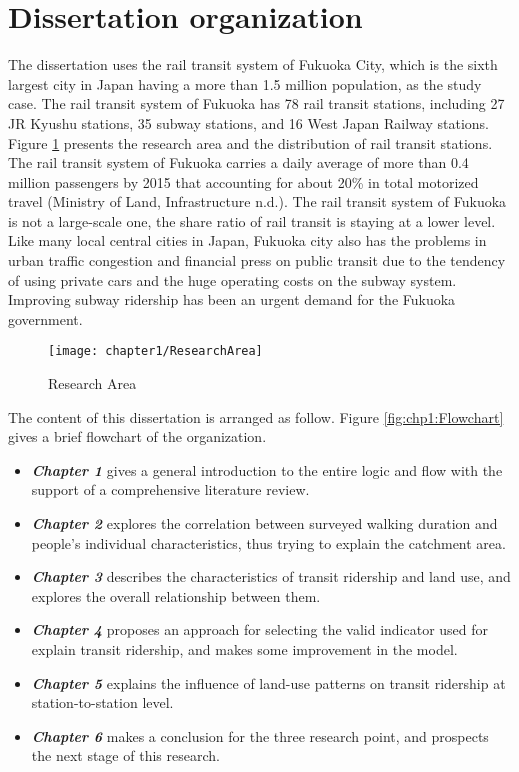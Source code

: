 %
\section{Dissertation organization}
The dissertation uses the rail transit system of Fukuoka City, which is the sixth largest city in Japan having a more than 1.5 million population, as the study case. The rail transit system of Fukuoka has 78 rail transit stations, including 27 JR Kyushu stations, 35 subway stations, and 16 West Japan Railway stations. Figure \ref{fig:chp1:ResearchArea} presents the research area and the distribution of rail transit stations. The rail transit system of Fukuoka carries a daily average of more than 0.4 million passengers by 2015 that accounting for about 20\% in total motorized travel (Ministry of Land, Infrastructure n.d.). The rail transit system of Fukuoka is not a large-scale one, the share ratio of rail transit is staying at a lower level. Like many local central cities in Japan, Fukuoka city also has the problems in urban traffic congestion and financial press on public transit due to the tendency of using private cars and the huge operating costs on the subway system. Improving subway ridership has been an urgent demand for the Fukuoka government.

\begin{figure}[htbp]
	\centering
	\texttt{[image: chapter1/ResearchArea]}
	\caption{Research Area}
	\label{fig:chp1:ResearchArea}
\end{figure}

The content of this dissertation is arranged as follow. Figure \ref{fig:chp1:Flowchart} gives a brief flowchart of the organization.

\begin{itemize}
	\item \emph{\textbf{Chapter 1}} gives a general introduction to the entire logic and flow with the support of a comprehensive literature review.
	\item \emph{\textbf{Chapter 2}} explores the correlation between surveyed walking duration and people's individual characteristics, thus trying to explain the catchment area.
	\item \emph{\textbf{Chapter 3}} describes the characteristics of transit ridership and land use, and explores the overall relationship between them.
	\item \emph{\textbf{Chapter 4}} proposes an approach for selecting the valid indicator used for explain transit ridership, and makes some improvement in the model.
	\item \emph{\textbf{Chapter 5}} explains the influence of land-use patterns on transit ridership at station-to-station level.
	\item \emph{\textbf{Chapter 6}} makes a conclusion for the three research point, and prospects the next stage of this research.
\end{itemize}

